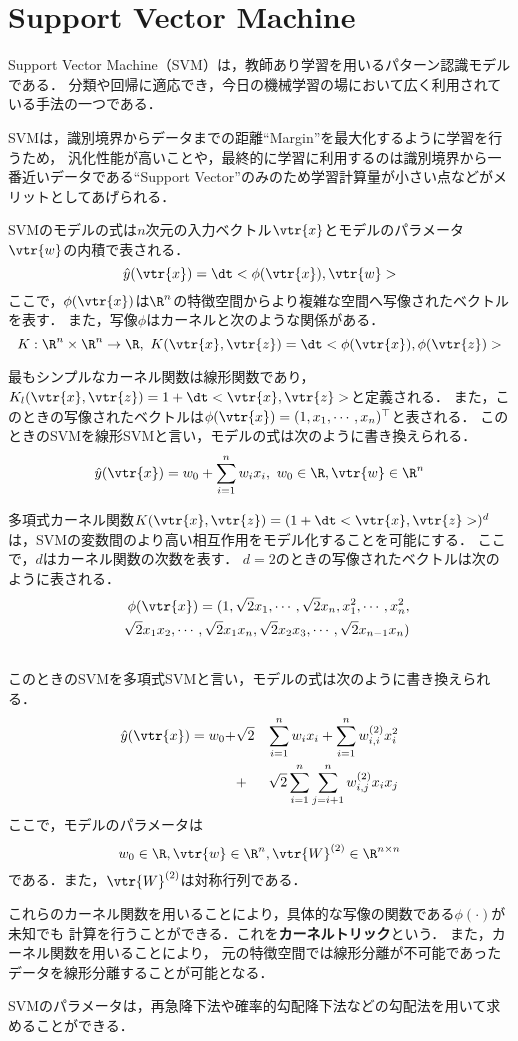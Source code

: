 \section{Support Vector Machine}
Support Vector Machine（SVM）は，教師あり学習を用いるパターン認識モデルである\cite{Cortes:1995:SN:218919.218929}．
分類や回帰に適応でき，今日の機械学習の場において広く利用されている手法の一つである．

SVMは，識別境界からデータまでの距離``Margin''を最大化するように学習を行うため，
汎化性能が高いことや，最終的に学習に利用するのは識別境界から一番近いデータである``Support Vector''のみのため学習計算量が小さい点などがメリットとしてあげられる．

SVMのモデルの式は$n$次元の入力ベクトル$\vtr{x}$とモデルのパラメータ$\vtr{w}$の内積で表される．
\begin{equation}
  \hat{y}(\vtr{x}) = \dt<\phi(\vtr{x}), \vtr{w}>
\end{equation}
ここで，$\phi(\vtr{x})$は$\R^{n}$の特徴空間からより複雑な空間へ写像されたベクトルを表す．
また，写像$\phi$はカーネルと次のような関係がある．
\begin{equation}
  K:\R^{n} \times \R^{n} \to \R, \ K(\vtr{x}, \vtr{z}) = \dt<\phi(\vtr{x}), \phi(\vtr{z})>
\end{equation}

最もシンプルなカーネル関数は線形関数であり，$K_{l}(\vtr{x},\vtr{z}) = 1 + \dt<\vtr{x},\vtr{z}>$と定義される．
また，このときの写像されたベクトルは$\phi(\vtr{x}) = (1, x_{1}, \cdots, x_{n})^{\top}$と表される．
このときのSVMを線形SVMと言い，モデルの式は次のように書き換えられる．
\begin{equation}
  \hat{y}(\vtr{x}) = w_{0} + \sum_{i=1}^{n}w_{i}{x}_{i},\  w_{0} \in \R, \vtr{w} \in \R^{n}
\end{equation}

多項式カーネル関数$K(\vtr{x},\vtr{z}) = (1 + \dt<\vtr{x},\vtr{z}>)^{d}$は，SVMの変数間のより高い相互作用をモデル化することを可能にする．
ここで，$d$はカーネル関数の次数を表す．
$d = 2$のときの写像されたベクトルは次のように表される．
\begin{eqnarray}
   &&\phi(\vtr{x}) = (1, \sqrt{2} x_{1}, \cdots, \sqrt{2} x_{n}, x_{1}^{2}, \cdots, x_{n}^{2}, \nonumber \\
   &&\sqrt{2}x_{1}x_{2}, \cdots, \sqrt{2}x_{1}x_{n}, \sqrt{2}x_{2}x_{3}, \cdots, \sqrt{2}x_{n-1}x_{n}) \nonumber\\
   &&
\end{eqnarray}
このときのSVMを多項式SVMと言い，モデルの式は次のように書き換えられる．
\begin{eqnarray}
  \hat{y}(\vtr{x}) = w_{0} + &\sqrt{2}& \sum_{i=1}^{n} w_{i} {x}_{i} + \sum_{i=1}^{n} w_{i,i}^{(2)} x_{i}^{2} \nonumber \\
  &+& \sqrt{2} \sum_{i=1}^{n} \sum_{j=i+1}^{n} w_{i,j}^{(2)} x_{i} x_{j} \label{eq:poly_SVM}
\end{eqnarray}
ここで，モデルのパラメータは
\begin{equation}
  w_{0} \in \R, \vtr{w} \in \R^{n}, \vtr{W}^{(2)} \in \R^{n \times n}
\end{equation}
である．また，$\vtr{W}^{(2)}$は対称行列である．

これらのカーネル関数を用いることにより，具体的な写像の関数である$\phi(\cdot)$が未知でも
計算を行うことができる．これを\textbf{カーネルトリック}という．
また，カーネル関数を用いることにより，
元の特徴空間では線形分離が不可能であったデータを線形分離することが可能となる．

SVMのパラメータは，再急降下法や確率的勾配降下法などの勾配法を用いて求めることができる．

